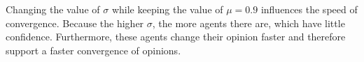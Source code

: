 \documentclass[11pt]{article}
\begin{document}
Changing the value of $\sigma$ while keeping the value of $\mu=0.9$ influences the speed of convergence. Because the higher $\sigma$, the more agents there are, which have little confidence. Furthermore, these agents change their opinion faster and therefore support a faster convergence of opinions.
\end{document}
